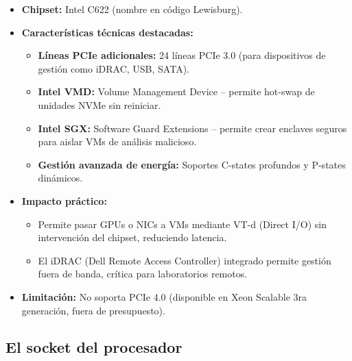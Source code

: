 \documentclass[12pt, letterpaper]{article}
\begin{document}
\begin{itemize}
    \item \textbf{Chipset:} Intel C622 (nombre en código Lewisburg).
    \item \textbf{Características técnicas destacadas:}
        \begin{itemize}
            \item \textbf{Líneas PCIe adicionales:} 24 líneas PCIe 3.0 (para dispositivos de gestión como iDRAC, USB, SATA).
            \item \textbf{Intel VMD:} Volume Management Device – permite hot-swap de unidades NVMe sin reiniciar.
            \item \textbf{Intel SGX:} Software Guard Extensions – permite crear enclaves seguros para aislar VMs de análisis malicioso.
            \item \textbf{Gestión avanzada de energía:} Soportes C-states profundos y P-states dinámicos.
        \end{itemize}
    \item \textbf{Impacto práctico:}
        \begin{itemize}
            \item Permite pasar GPUs o NICs a VMs mediante VT-d (Direct I/O) sin intervención del chipset, reduciendo latencia.
            \item El iDRAC (Dell Remote Access Controller) integrado permite gestión fuera de banda, crítica para laboratorios remotos.
        \end{itemize}
    \item \textbf{Limitación:} No soporta PCIe 4.0 (disponible en Xeon Scalable 3ra generación, fuera de presupuesto).
\end{itemize}

\subsection{El socket del procesador}
\end{document}
